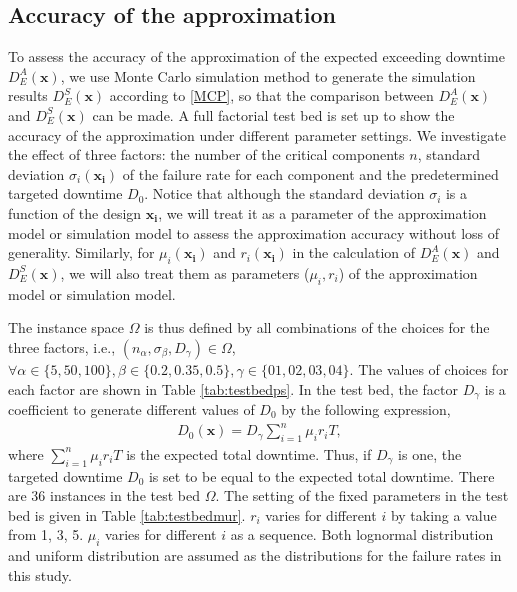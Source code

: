 \documentclass[preprint,12pt]{elsarticle}
\begin{document}
\subsection{Accuracy of the approximation}
To assess the accuracy of the approximation of the expected exceeding downtime $D_{E}^{A}(\boldsymbol{x})$, we use Monte Carlo simulation method to generate the simulation results $D_{E}^{S}(\boldsymbol{x})$ according to \ref{MCP}, so that the comparison between $D_{E}^{A}(\boldsymbol{x})$ and $D_{E}^{S}(\boldsymbol{x})$ can be made. A full factorial test bed is set up to show the accuracy of the approximation under different parameter settings. We investigate the effect of three factors: the number of the critical components $n$, standard deviation $\sigma_{i}(\boldsymbol{x_i})$ of the failure rate for each component and the predetermined targeted downtime $D_{0}$. Notice that although the standard deviation $\sigma_i$ is a function of the design $\boldsymbol{x_i}$, we will treat it as a parameter of the approximation model or simulation model to assess the approximation accuracy without loss of generality. Similarly, for $\mu_i(\boldsymbol{x_i})$ and $r_i(\boldsymbol{x_i})$ in the calculation of $D_{E}^{A}(\boldsymbol{x})$ and $D_{E}^{S}(\boldsymbol{x})$, we will also treat them as parameters ($\mu_i , r_i$) of the approximation model or simulation model.

The instance space $\Omega$ is thus defined by all combinations of the choices for the three factors, i.e., $(n_{\alpha},\sigma_{\beta},D_{\gamma}) \in \Omega$, $\forall \alpha \in \{5,50,100\}, \beta \in \{0.2,0.35,0.5\}, \gamma \in \{01,02,03,04\}$. The values of choices for each factor are shown in Table \ref{tab:testbedps}. In the test bed, the factor $D_{\gamma}$ is a coefficient to generate different values of $D_0$ by the following expression,
 \begin{eqnarray}
 D_{0}(\boldsymbol{x}) = D_{\gamma}\sum_{i=1}^{n}{\mu_{i} r_{i} T}, \label{D0}
\end{eqnarray}
where $\sum_{i=1}^{n}{\mu_{i} r_{i} T}$ is the expected total downtime. Thus, if $D_{\gamma}$ is one, the targeted downtime $D_0$ is set to be equal to the expected total downtime.
There are 36 instances in the test bed $\Omega$. The setting of the fixed parameters in the test bed is given in Table \ref{tab:testbedmur}. $r_{i}$ varies for different $i$ by taking a value from {1, 3, 5}. $\mu_{i}$ varies for different $i$ as a sequence. Both lognormal distribution and uniform distribution are assumed as the distributions for the failure rates in this study.
\end{document}
